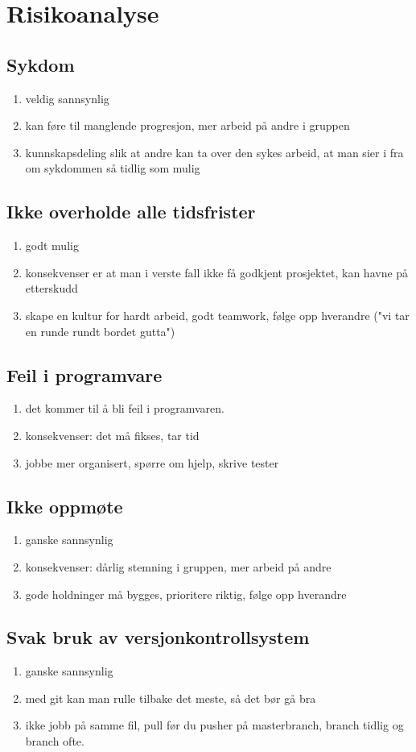 
\section{Risikoanalyse}
\subsection*{Sykdom}
\begin{enumerate}
\item veldig sannsynlig
\item kan føre til manglende progresjon, mer arbeid på andre i gruppen
\item kunnskapsdeling slik at andre kan ta over den sykes arbeid, at man sier i fra om sykdommen så tidlig som mulig
\end{enumerate}

\subsection*{Ikke overholde alle tidsfrister}
\begin{enumerate}
\item godt mulig
\item konsekvenser er at man i verste fall ikke få godkjent prosjektet, kan havne på etterskudd 
\item skape en kultur for hardt arbeid, godt teamwork, følge opp hverandre ("vi tar en runde rundt bordet gutta")
\end{enumerate}

\subsection*{Feil i programvare}
\begin{enumerate}
\item det kommer til å bli feil i programvaren.
\item konsekvenser: det må fikses, tar tid 
\item jobbe mer organisert, spørre om hjelp, skrive tester
\end{enumerate}

\subsection*{Ikke oppmøte}
\begin{enumerate}
\item ganske sannsynlig
\item konsekvenser: dårlig stemning i gruppen, mer arbeid på andre
\item gode holdninger må bygges, prioritere riktig, følge opp hverandre
\end{enumerate}

\subsection*{Svak bruk av versjonkontrollsystem}
\begin{enumerate}
\item ganske sannsynlig
\item med git kan man rulle tilbake det meste, så det bør gå bra
\item ikke jobb på samme fil, pull før du pusher på masterbranch, branch tidlig og branch ofte.
\end{enumerate}
